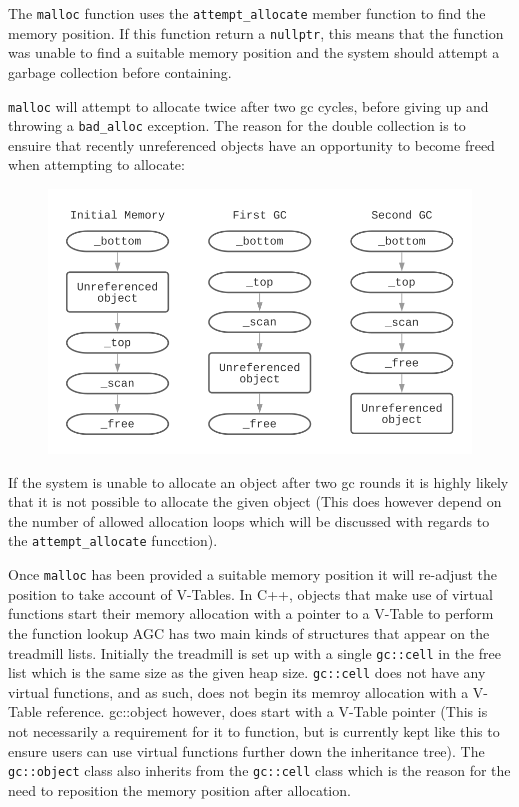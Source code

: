 \documentclass[11pt]{article}
\begin{document}
The \texttt{malloc} function uses the \texttt{attempt\_allocate} member function to find the memory position. If this function return a \texttt{nullptr}, this 
means that the function was unable to find a suitable memory position and the system should attempt a garbage collection before containing.

\texttt{malloc} will attempt to allocate twice after two gc cycles, before giving up and throwing a \texttt{bad\_alloc} exception.
The reason for the double collection is to ensuire that recently unreferenced objects have an opportunity to become freed when attempting
to allocate:

\begin{figure}[H]
    \begin{center}
    \includegraphics[scale=0.5]{./report_srcs/collecting_unreferenced_object.png}
    \end{center}
\end{figure}

If the system is unable to allocate an object after two gc rounds it is highly likely that it is not possible to allocate the given object 
(This does however depend on the number of allowed allocation loops which will be discussed with regards to the \texttt{attempt\_allocate} funcction).

Once \texttt{malloc} has been provided a suitable memory position it will re-adjust the position to take account of V-Tables.
In C++, objects that make use of virtual functions start their memory allocation with a pointer to a V-Table to perform the function lookup
AGC has two main kinds of structures that appear on the treadmill lists.
Initially the treadmill is set up with a single \texttt{gc::cell} in the free list which is the same size as the given heap size.
\texttt{gc::cell} does not have any virtual functions, and as such, does not begin its memroy allocation with a V-Table reference.
gc::object however, does start with a V-Table pointer (This is not necessarily a requirement for it to function, but is currently kept like 
this to ensure users can use virtual functions further down the inheritance tree). The \texttt{gc::object} class also inherits from the \texttt{gc::cell}
class which is the reason for the need to reposition the memory position after allocation.
\end{document}
